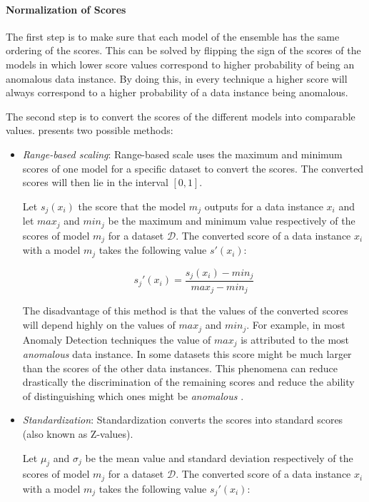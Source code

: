 {\paragraph{Normalization of Scores}\mbox{}

The first step is to make sure that each model of the ensemble has the same ordering of the scores.
This can be solved by flipping the sign of the scores of the models in which lower score values correspond to higher probability of being an anomalous data instance.
By doing this, in every technique a higher score will always correspond to a higher probability of a data instance being anomalous.

The second step is to convert the scores of the different models into comparable values.
\textcite{Aggarwal:2013:OA:2436823} presents two possible methods:

\begin{itemize}
	\item \textit{Range-based scaling}:
	Range-based scale uses the maximum and minimum scores of one model for a specific dataset to convert the scores.
	The converted scores will then lie in the interval $[0,1]$.
	
	Let $s_j(x_i)$ the score that the model $m_j$ outputs for a data instance $x_i$ and let $max_{j}$ and $min_{j}$ be the maximum and minimum value respectively of the scores of model $m_j$ for a dataset $\mathcal{D}$.
	The converted score of a data instance $x_i$ with a model $m_j$ takes the following value $s'(x_i)$: 
	
	\begin{equation}
	s_j'(x_i) = \frac{s_j(x_i) - min_j}
	{max_j - min_j}
	\end{equation}
	
	The disadvantage of this method is that the values of the converted scores will depend highly on the values of $max_j$ and $min_j$.
	For example, in most Anomaly Detection techniques the value of $max_j$ is attributed to the most \textit{anomalous} data instance.
	In some datasets this score might be much larger than the scores of the other data instances.
	This phenomena can reduce drastically the discrimination of the remaining scores and reduce the ability of distinguishing which ones might be \textit{anomalous} \cite{Aggarwal:2013:OA:2436823}.
	
	\item \textit{Standardization}: 
	Standardization converts the scores into standard scores (also known as Z-values).
	
	Let $\mu_j$ and $\sigma_j$ be the mean value and standard deviation respectively of the scores of model $m_j$ for a dataset $\mathcal{D}$.	
	The converted score of a data instance $x_i$ with a model $m_j$ takes the following value $s_j'(x_i)$:
	

\end{itemize}}
